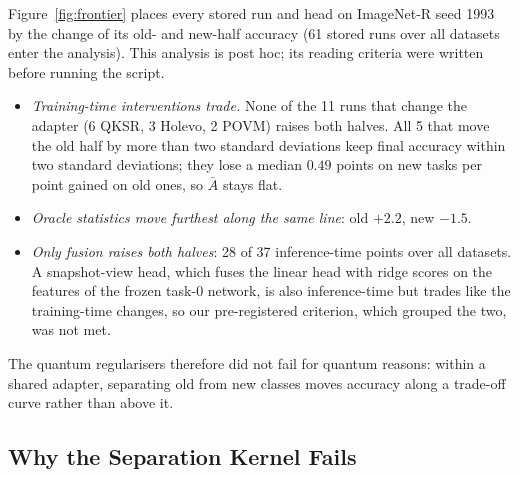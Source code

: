Figure~\ref{fig:frontier} places every stored run and head on ImageNet-R seed
1993 by the change of its old- and new-half accuracy (61 stored runs over all
datasets enter the analysis). This analysis is post hoc; its reading criteria
were written before running the script.
\begin{itemize}
  \item \emph{Training-time interventions trade.} None of the 11 runs that
    change the adapter (6 QKSR, 3 Holevo, 2 POVM) raises both halves. All 5
    that move the old half by more than two standard deviations keep final
    accuracy within two standard deviations; they lose a median $0.49$ points
    on new tasks per point gained on old ones, so $\bar A$ stays flat.
  \item \emph{Oracle statistics move furthest along the same line}: old
    $+2.2$, new $-1.5$.
  \item \emph{Only fusion raises both halves}: 28 of 37 inference-time points
    over all datasets. A snapshot-view head, which fuses the linear
    head with ridge scores on the features of the frozen task-0 network, is
    also inference-time but trades like the training-time changes, so our pre-registered criterion, which
    grouped the two, was not met.
\end{itemize}
The quantum regularisers therefore did not fail for quantum reasons: within
a shared adapter, separating old from new classes moves accuracy along a
trade-off curve rather than above it.

\subsection{Why the Separation Kernel Fails}
\label{sec:qksr-analysis}

